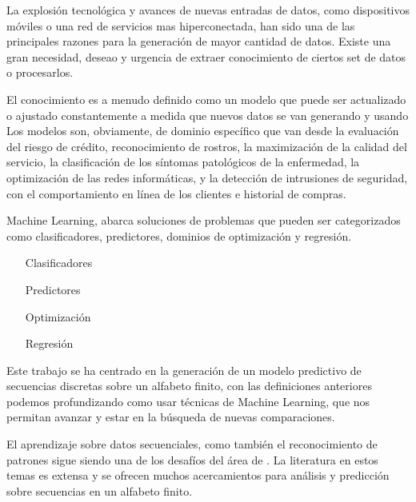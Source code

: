 

La explosión tecnológica y avances de nuevas entradas de datos, como dispositivos móviles o una red de servicios mas hiperconectada, han sido una de las principales razones para la generación de mayor cantidad de datos. Existe una gran necesidad, deseao y urgencia de extraer conocimiento de ciertos set de datos o procesarlos.

El conocimiento es a menudo definido como un modelo que puede ser actualizado o ajustado constantemente a medida que nuevos datos se van generando y usando
Los modelos son, obviamente, de dominio específico que van desde la evaluación del riesgo de crédito, reconocimiento de rostros, la maximización de la calidad del servicio, la clasificación de los síntomas patológicos de la enfermedad, la optimización de las redes informáticas, y la detección de intrusiones de seguridad, con el comportamiento en línea de los clientes e historial de compras.


Machine Learning, abarca soluciones de problemas que pueden ser categorizados como clasificadores, predictores, dominios de optimización y regresión.

\begin{itemize}
	
	\item[Clasificadores]  	

	\item[Predictores] 						

	\item[Optimización] 				

	\item[Regresión] 									

\end{itemize}




Este trabajo se ha centrado en la generación de un modelo predictivo de secuencias discretas sobre un alfabeto finito, con las definiciones anteriores podemos profundizando como usar técnicas de Machine Learning, que nos permitan avanzar y estar en la búsqueda de nuevas comparaciones.

El aprendizaje sobre datos secuenciales, como también el reconocimiento de patrones sigue siendo una de los desafíos del área de \machinelearning.
La literatura en estos temas es extensa y se ofrecen muchos acercamientos para análisis y predicción sobre secuencias en un alfabeto finito.

